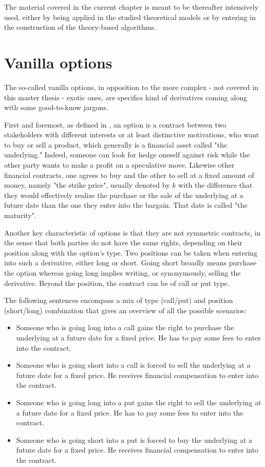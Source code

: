 \documentclass[12pt,a4paper]{report}
\begin{document}
The material covered in the current chapter is meant to be thereafter intensively used, either by being applied in the studied theoretical models or by entering in the construction of the theory-based algorithms.

\section{Vanilla options}
\label{sec:upstream:vanilla}

The so-called vanilla options, in opposition to the more complex - not covered in this master thesis - exotic ones, are specifics kind of derivatives coming along with some good-to-know jargons. 

First and foremost,  as defined in \citet{hull}, an option is a contract between two stakeholders with different interests or at least distinctive motivations, who want to buy or sell a product, which generally is a financial asset called "the underlying." 
Indeed, someone can look for hedge oneself against risk while the other party wants to make a profit on a speculative move.
Likewise other financial contracts, one agrees to buy and the other to sell at a fixed amount of money, namely "the strike price", usually denoted by $k$ with the difference that they would effectively realize the purchase or the sale of the underlying at a future date than the one they enter into the bargain. That date is called "the maturity".


Another key characteristic of options is that they are not symmetric contracts, in the sense that both parties do not have the same rights, depending on their position along with the option's type. 
Two positions can be taken when entering into such a derivative, either long or short. 
Going short broadly means purchase the option whereas going long implies writing, or synonymously, selling the derivative. Beyond the position, the contract can be of call or put type. 

The following sentences encompass a mix of type (call/put) and position (short/long) combination that gives an overview of all the possible scenarios:

\begin{itemize}
\item Someone who is going long into a call gains the right to purchase the underlying at a future date for a fixed price. He has to pay some fees to enter into the contract.
\item Someone who is going short into a call is forced to sell the underlying at a future date for a fixed price. He receives financial compensation to enter into the contract.
\item Someone who is going long into a put gains the right to sell the underlying at a future date for a fixed price. He has to pay some fees to enter into the contract.
\item Someone who is going short into a put is forced to buy the underlying at a future date for a fixed price. He receives financial compensation to enter into the contract.
\end{itemize}
\end{document}
